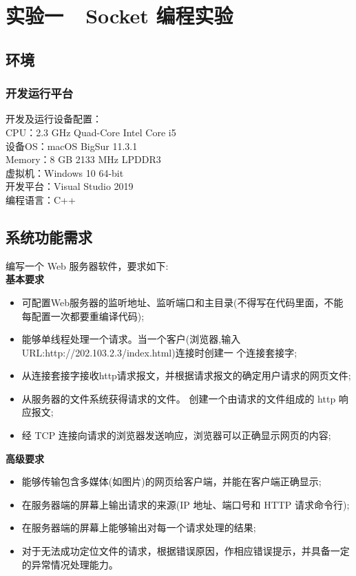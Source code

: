 \section{实验一\ \ Socket 编程实验}
\subsection{环境}
\subsubsection{开发运行平台}
\setlength{\parindent}{0pt}
开发及运行设备配置：\\
\hspace*{2em}CPU：2.3 GHz Quad-Core Intel Core i5\\
\hspace*{2em}设备OS：macOS BigSur 11.3.1\\
\hspace*{2em}Memory：8 GB 2133 MHz LPDDR3\\
\hspace*{2em}虚拟机：Windows 10 64-bit\\
开发平台：Visual Studio 2019\\
\hspace*{2em}编程语言：C++\\
\subsection{系统功能需求}
\smallskip
\vspace{0.2cm}
编写一个 Web 服务器软件，要求如下:\\
\textbf{基本要求}
\begin{itemize}
  \item 可配置Web服务器的监听地址、监听端口和主目录(不得写在代码里面，不能每配置一次都要重编译代码);
  \item 能够单线程处理一个请求。当一个客户(浏览器,输入 URL:http://202.103.2.3/index.html)连接时创建一 个连接套接字;
  \item 从连接套接字接收http请求报文，并根据请求报文的确定用户请求的网页文件;
  \item 从服务器的文件系统获得请求的文件。 创建一个由请求的文件组成的 http 响应报文;
  \item 经 TCP 连接向请求的浏览器发送响应，浏览器可以正确显示网页的内容;
\end{itemize}
\textbf{高级要求}
\begin{itemize}
  \item 能够传输包含多媒体(如图片)的网页给客户端，并能在客户端正确显示;
  \item 在服务器端的屏幕上输出请求的来源(IP 地址、端口号和 HTTP 请求命令行);
  \item 在服务器端的屏幕上能够输出对每一个请求处理的结果;
  \item 对于无法成功定位文件的请求，根据错误原因，作相应错误提示，并具备一定的异常情况处理能力。
\end{itemize}

